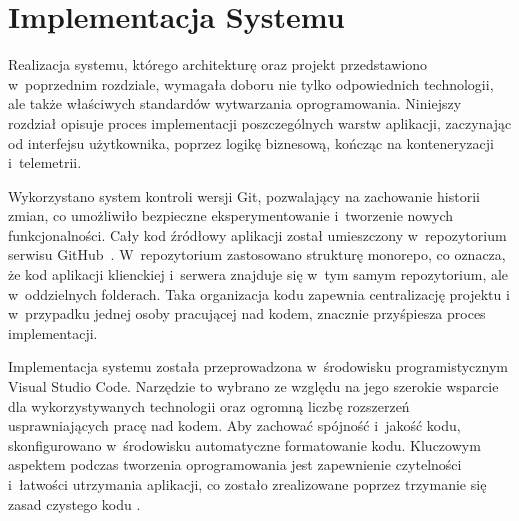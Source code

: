 \chapter{Implementacja Systemu}
\label{ch:implementacja_systemu}

Realizacja systemu, którego architekturę oraz projekt przedstawiono w~poprzednim rozdziale, wymagała doboru nie tylko odpowiednich technologii, 
ale także właściwych standardów wytwarzania oprogramowania. Niniejszy rozdział opisuje proces implementacji poszczególnych warstw aplikacji, zaczynając 
od interfejsu użytkownika, poprzez logikę biznesową, kończąc na konteneryzacji i~telemetrii. 

Wykorzystano system kontroli wersji Git, pozwalający na zachowanie historii zmian, co umożliwiło bezpieczne eksperymentowanie i~tworzenie nowych funkcjonalności.
Cały kod źródłowy aplikacji został umieszczony w~repozytorium serwisu GitHub~\cite{githubRepo}. W~repozytorium zastosowano strukturę monorepo, co oznacza, 
że kod aplikacji klienckiej i~serwera znajduje się w~tym samym repozytorium, ale w~oddzielnych folderach. Taka organizacja kodu zapewnia centralizację projektu 
i w~przypadku jednej osoby pracującej nad kodem, znacznie przyśpiesza proces implementacji.

Implementacja systemu została przeprowadzona w~środowisku programistycznym Visual Studio Code. Narzędzie to wybrano ze względu na jego 
szerokie wsparcie dla wykorzystywanych technologii oraz ogromną liczbę rozszerzeń usprawniających pracę nad kodem. 
Aby zachować spójność i~jakość kodu, skonfigurowano w~środowisku automatyczne formatowanie kodu.
Kluczowym aspektem podczas tworzenia oprogramowania jest zapewnienie czytelności i~łatwości utrzymania aplikacji, 
co zostało zrealizowane poprzez trzymanie się zasad czystego kodu \cite{cleancode}.

